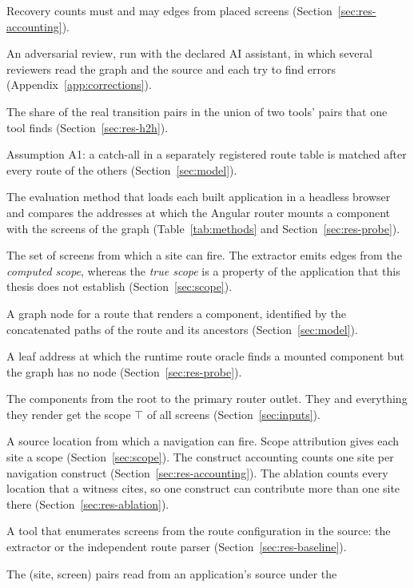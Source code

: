 \documentclass[english,12pt,a4paper,sci,utf8,a-2b,online]{aaltothesis}
\numberwithin{table}{section}
\numberwithin{figure}{section}
\numberwithin{equation}{section}
\begin{document}
\begin{description}[nosep]
Recovery counts must and may edges from placed screens (Section~\ref{sec:res-accounting}).
\item[Red-team panel] An adversarial review, run with the declared AI assistant, in which several
reviewers read the graph and the source and each try to find errors
(Appendix~\ref{app:corrections}).
\item[Relative recall] The share of the real transition pairs in the union of two tools' pairs that
one tool finds (Section~\ref{sec:res-h2h}).
\item[Route-order assumption] Assumption A1: a catch-all in a separately registered route table is
matched after every route of the others (Section~\ref{sec:model}).
\item[Runtime route oracle] The evaluation method that loads each built application in a headless
browser and compares the addresses at which the Angular router mounts a component with the screens
of the graph (Table~\ref{tab:methods} and Section~\ref{sec:res-probe}).
\item[Scope] The set of screens from which a site can fire. The extractor emits edges from the
\emph{computed scope}, whereas the \emph{true scope} is a property of the application that this
thesis does not establish (Section~\ref{sec:scope}).
\item[Screen] A graph node for a route that renders a component, identified by the concatenated
paths of the route and its ancestors (Section~\ref{sec:model}).
\item[Screen without a node] A leaf address at which the runtime route oracle finds a mounted component
but the graph has no node (Section~\ref{sec:res-probe}).
\item[Shell] The components from the root to the primary router outlet. They and everything they
render get the scope $\top$ of all screens (Section~\ref{sec:inputs}).
\item[Site, navigation site] A source location from which a navigation can fire. Scope
attribution gives each site a scope (Section~\ref{sec:scope}). The construct accounting counts
one site per navigation construct (Section~\ref{sec:res-accounting}). The ablation counts every
location that a witness cites, so one construct can contribute more than one site there
(Section~\ref{sec:res-ablation}).
\item[Static reader] A tool that enumerates screens from the route configuration in the source:
the extractor or the independent route parser (Section~\ref{sec:res-baseline}).
\item[Structural reference] The (site, screen) pairs read from an application's source under the

\end{description}
\end{document}
